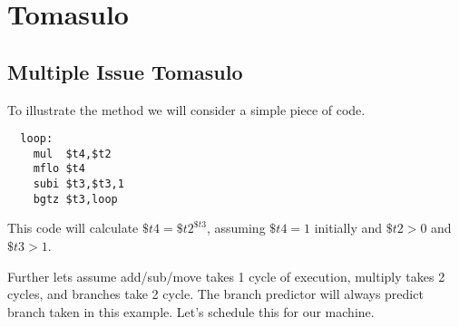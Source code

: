 \chapter{Tomasulo}\label{c-tomasulo}


\section{Multiple Issue Tomasulo}

To illustrate the method we will consider a simple piece of code.
\begin{verbatim}
  loop:
    mul  $t4,$t2
    mflo $t4
    subi $t3,$t3,1
    bgtz $t3,loop
\end{verbatim}
This code will calculate $ \$t4 = \$t2^{\$t3}$, assuming $\$t4=1$ initially and $\$t2>0$ and $\$t3>1$.

Further lets assume add/sub/move takes 1 cycle of execution, multiply takes 2 cycles, and branches take 2 cycle.  The branch predictor will always predict branch taken in this example.  Let's schedule this for our machine.


